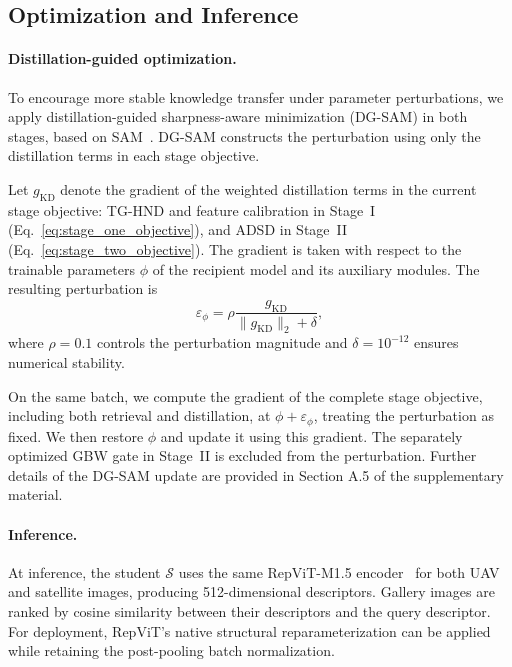 \subsection{Optimization and Inference}
\label{sec:optimization}

\paragraph{Distillation-guided optimization.}
To encourage more stable knowledge transfer under parameter
perturbations, we apply distillation-guided sharpness-aware
minimization (DG-SAM) in both stages, based on
SAM~\cite{foret2021sam}. DG-SAM constructs the perturbation
using only the distillation terms in each stage objective.

Let $g_{\mathrm{KD}}$ denote the gradient of the weighted
distillation terms in the current stage objective: TG-HND
and feature calibration in Stage~I
(Eq.~\eqref{eq:stage_one_objective}), and ADSD in Stage~II
(Eq.~\eqref{eq:stage_two_objective}). The gradient is taken
with respect to the trainable parameters $\phi$ of the
recipient model and its auxiliary modules. The resulting
perturbation is
\begin{equation}
\varepsilon_{\phi}
=\rho\frac{g_{\mathrm{KD}}}
{\|g_{\mathrm{KD}}\|_2+\delta},
\label{eq:dgsam_perturbation}
\end{equation}
where $\rho=0.1$ controls the perturbation magnitude and
$\delta=10^{-12}$ ensures numerical stability.

On the same batch, we compute the gradient of the complete
stage objective, including both retrieval and distillation,
at $\phi+\varepsilon_{\phi}$, treating the perturbation as
fixed. We then restore $\phi$ and update it using this
gradient. The separately optimized GBW gate in Stage~II is
excluded from the perturbation. Further details of the
DG-SAM update are provided in Section A.5 of the supplementary material.

\paragraph{Inference.}
At inference, the student $\mathcal{S}$ uses the same
RepViT-M1.5 encoder~\cite{wang2024repvit} for both UAV
and satellite images, producing 512-dimensional descriptors.
Gallery images are ranked by cosine similarity between their
descriptors and the query descriptor. For deployment, RepViT's
native structural reparameterization can be applied while
retaining the post-pooling batch normalization.
